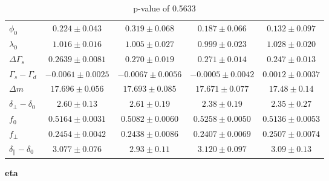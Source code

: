 \documentclass[aspectratio=43]{beamer}
\begin{document}
\begin{frame}
\begin{table}[H]
{\begin{tabular}{l|cccc}
\hline
$                        \phi_0$ & $     0.224 \pm 0.043$ & $     0.319 \pm 0.068$ & $     0.187 \pm 0.066$ & $     0.132 \pm 0.097$ \\
$                     \lambda_0$ & $     1.016 \pm 0.016$ & $     1.005 \pm 0.027$ & $     0.999 \pm 0.023$ & $     1.028 \pm 0.020$ \\
$                \Delta\Gamma_s$ & $   0.2639 \pm 0.0081$ & $     0.270 \pm 0.019$ & $     0.271 \pm 0.014$ & $     0.247 \pm 0.013$ \\
$           \Gamma_s - \Gamma_d$ & $  -0.0061 \pm 0.0025$ & $  -0.0067 \pm 0.0056$ & $  -0.0005 \pm 0.0042$ & $   0.0012 \pm 0.0037$ \\
$                      \Delta m$ & $    17.696 \pm 0.056$ & $    17.693 \pm 0.085$ & $    17.671 \pm 0.077$ & $      17.48 \pm 0.14$ \\
$     \delta_{\perp} - \delta_0$ & $       2.60 \pm 0.13$ & $       2.61 \pm 0.19$ & $       2.38 \pm 0.19$ & $       2.35 \pm 0.27$ \\
$                           f_0$ & $   0.5164 \pm 0.0031$ & $   0.5082 \pm 0.0060$ & $   0.5258 \pm 0.0050$ & $   0.5136 \pm 0.0053$ \\
$                     f_{\perp}$ & $   0.2454 \pm 0.0042$ & $   0.2438 \pm 0.0086$ & $   0.2407 \pm 0.0069$ & $   0.2507 \pm 0.0074$ \\
$ \delta_{\parallel} - \delta_0$ & $     3.077 \pm 0.076$ & $       2.93 \pm 0.11$ & $     3.120 \pm 0.097$ & $       3.09 \pm 0.13$ \\
\end{tabular}}
\caption{
p-value of 0.5633
}\end{table}
\newpage \textbf{ eta }
\begin{table}[H]
\end{table}
\end{frame}
\end{document}
